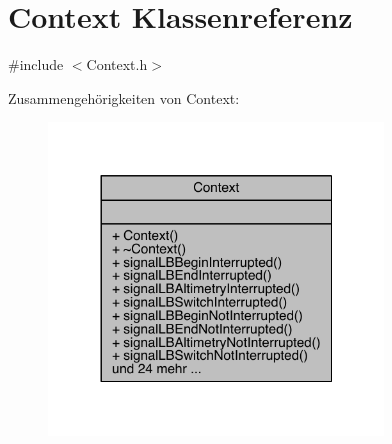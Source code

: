 \hypertarget{class_context}{}\section{Context Klassenreferenz}
\label{class_context}


{\ttfamily \#include $<$Context.\+h$>$}



Zusammengehörigkeiten von Context\+:\nopagebreak
\begin{figure}[H]
\begin{center}
\leavevmode
\includegraphics[width=252pt]{class_context__coll__graph}
\end{center}
\end{figure}
